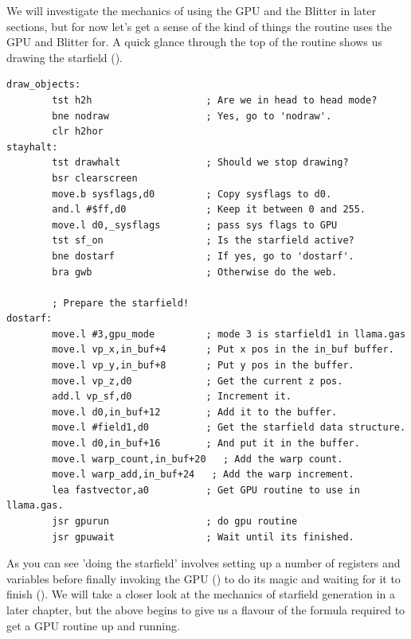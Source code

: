 We will investigate the mechanics of using the GPU and the Blitter in later sections, but for now let's get a
sense of the kind of things the  routine uses the GPU and Blitter for.
A quick glance through the top of the routine shows us drawing the starfield ().

\begin{lstlisting}[escapechar=\%]
draw_objects:
        tst h2h                    ; Are we in head to head mode?
        bne nodraw                 ; Yes, go to 'nodraw'.
        clr h2hor
stayhalt:
        tst drawhalt               ; Should we stop drawing?
        bsr clearscreen
        move.b sysflags,d0         ; Copy sysflags to d0.
        and.l #$ff,d0              ; Keep it between 0 and 255.
        move.l d0,_sysflags        ; pass sys flags to GPU
        tst sf_on                  ; Is the starfield active?
        bne dostarf                ; If yes, go to 'dostarf'.
        bra gwb                    ; Otherwise do the web.
    
        ; Prepare the starfield!
dostarf:
        move.l #3,gpu_mode         ; mode 3 is starfield1 in llama.gas
        move.l vp_x,in_buf+4       ; Put x pos in the in_buf buffer.
        move.l vp_y,in_buf+8       ; Put y pos in the buffer.
        move.l vp_z,d0             ; Get the current z pos.
        add.l vp_sf,d0             ; Increment it.
        move.l d0,in_buf+12        ; Add it to the buffer.
        move.l #field1,d0          ; Get the starfield data structure.
        move.l d0,in_buf+16        ; And put it in the buffer.
        move.l warp_count,in_buf+20   ; Add the warp count.
        move.l warp_add,in_buf+24   ; Add the warp increment.
        lea fastvector,a0          ; Get GPU routine to use in llama.gas.
        jsr gpurun                 ; do gpu routine
        jsr gpuwait                ; Wait until its finished.
\end{lstlisting}

As you can see 'doing the starfield' involves setting up a number of registers and variables
before finally invoking the GPU () to do its magic and waiting for it to finish
(). We will take a closer look at the mechanics of starfield generation in a later
chapter, but the above begins to give us a flavour of the formula required to get a GPU routine up 
and running.

